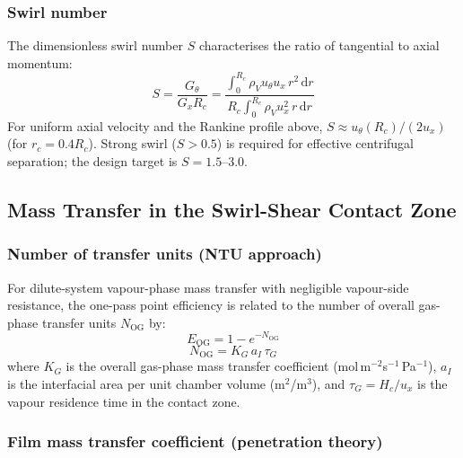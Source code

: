 \documentclass[11pt,letterpaper]{article}
\newcommand{\rhoV}{\rho_V}
\newcommand{\utheta}{u_{\theta}}
\newcommand{\ux}{u_{x}}
\newcommand{\Ntu}{N_{\mathrm{OG}}}
\newcommand{\Eog}{E_{\mathrm{OG}}}
\newcommand{\Rc}{R_c}
\newcommand{\Hc}{H_c}
\begin{document}
\subsubsection{Swirl number}

The dimensionless swirl number $S$ characterises the ratio of tangential to
axial momentum:
\begin{equation}
  S = \frac{G_\theta}{G_x \Rc}
    = \frac{\int_0^{\Rc} \rhoV \utheta \ux\,r^2\,\mathrm{d}r}
           {\Rc \int_0^{\Rc} \rhoV \ux^2\,r\,\mathrm{d}r}
  \label{eq:swirl_number}
\end{equation}
For uniform axial velocity and the Rankine profile above,
$S \approx \utheta(\Rc)/(2\ux)$ (for $r_c = 0.4\Rc$).  Strong swirl
($S > 0.5$) is required for effective centrifugal separation; the design
target is $S = 1.5$--3.0.

\subsection{Mass Transfer in the Swirl-Shear Contact Zone}
\label{sec:masstransfer}

\subsubsection{Number of transfer units (NTU approach)}

For dilute-system vapour-phase mass transfer with negligible vapour-side
resistance, the one-pass point efficiency is related to the number of
overall gas-phase transfer units $\Ntu$ by:
\begin{equation}
  \Eog = 1 - e^{-\Ntu}
  \label{eq:eog}
\end{equation}
\begin{equation}
  \Ntu = K_G\,a_I\,\tau_G
  \label{eq:ntu}
\end{equation}
where $K_G$ is the overall gas-phase mass transfer coefficient
(mol\,m$^{-2}$s$^{-1}$\,Pa$^{-1}$), $a_I$ is the interfacial area per unit
chamber volume (m$^2$/m$^3$), and $\tau_G = \Hc/\ux$ is the vapour
residence time in the contact zone.

\subsubsection{Film mass transfer coefficient (penetration theory)}
\end{document}
